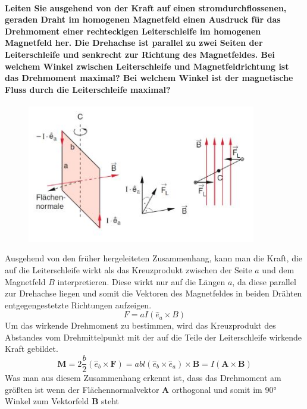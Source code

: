 \documentclass[a4paper, 11pt, parskip=half]{scrartcl}
\begin{document}
\paragraph{Leiten Sie ausgehend von der Kraft auf einen stromdurchflossenen, geraden Draht im
homogenen Magnetfeld einen Ausdruck für das Drehmoment einer rechteckigen Leiterschleife im
homogenen Magnetfeld her. Die Drehachse ist parallel zu zwei Seiten der Leiterschleife und senkrecht
zur Richtung des Magnetfeldes. Bei welchem Winkel zwischen Leiterschleife und Magnetfeldrichtung ist
das Drehmoment maximal? Bei welchem Winkel ist der magnetische Fluss durch die Leiterschleife
maximal?}
\begin{figure}[H]
    \centering
    \label{Drehmoment}
    \includegraphics[height=6cm]{image/5/5.5.JPG}
\end{figure}
Ausgehend von den früher hergeleiteten Zusammenhang, kann man die Kraft, die auf die Leiterschleife wirkt als das Kreuzprodukt zwischen der Seite $a$ und dem Magnetfeld $B$ interpretieren. 
Diese wirkt nur auf die Längen $a$, da diese parallel zur Drehachse liegen und somit die Vektoren des Magnetfeldes in beiden Drähten entgegengestetzte Richtungen aufzeigen.
\begin{equation}
    F = a I ( \hat{e}_a \times B)
\end{equation}
Um das wirkende Drehmoment zu bestimmen, wird das Kreuzprodukt des Abstandes vom Drehmittelpunkt mit der auf die Teile der Leiterschleife wirkende Kraft gebildet.
\begin{equation}
    \textbf{M} = 2\frac{b}{2} ( \hat{e}_b \times \textbf{F}) = abl (\hat{e}_b \times \hat{e}_a) \times \textbf{B} = I(\textbf{A}\times\textbf{B})
\end{equation}
Was man aus diesem Zusammenhang erkennt ist, dass das Drehmoment am größten ist wenn der Flächennormalvektor $\textbf{A}$ orthogonal und somit im 90° Winkel zum Vektorfeld $\textbf{B}$ steht
\end{document}
